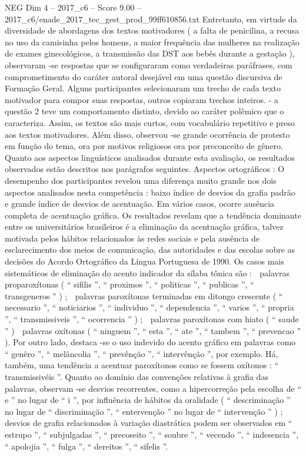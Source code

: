 \begin{textsample}{NEG Dim 4 – 2017\_c6 – Score 9.00 – 2017\_c6/enade\_2017\_tec\_gest\_prod\_99ff610856.txt}
Entretanto, em virtude da diversidade de abordagens dos textos motivadores ( a falta de penicilina, a recusa no uso da camisinha pelos homens, a maior frequência das mulheres na realização de exames ginecológicos, a transmissão das DST aos bebês durante a gestação ), observaram -se respostas que se configuraram como verdadeiras paráfrases, com comprometimento do caráter autoral desejável em uma questão discursiva de Formação Geral.
Alguns participantes selecionaram um trecho de cada texto motivador para compor suas respostas, outros copiaram trechos inteiros. - a questão 2 teve um comportamento distinto, devido ao caráter polêmico que o caracteriza.
Assim, os textos são mais curtos, com vocabulário repetitivo e preso aos textos motivadores.
Além disso, observou -se grande ocorrência de protesto em função do tema, ora por motivos religiosos ora por preconceito de gênero.
Quanto aos aspectos linguísticos analisados durante esta avaliação, os resultados observados estão descritos nos parágrafos seguintes.
Aspectos ortográficos : O desempenho dos participantes revelou uma diferença muito grande nos dois aspectos analisados nesta competência : baixo índice de desvios da grafia padrão e grande índice de desvios de acentuação.
Em vários casos, ocorre ausência completa de acentuação gráfica.
Os resultados revelam que a tendência dominante entre os universitários brasileiros é a eliminação da acentuação gráfica, talvez motivada pelos hábitos relacionados às redes sociais e pela ausência de esclarecimento dos meios de comunicação, das autoridades e das escolas sobre as decisões do Acordo Ortográfico da Língua Portuguesa de 1990.
Os casos mais sistemáticos de eliminação do acento indicador da sílaba tônica são :  palavras proparoxítonas ( “ sifilis ”, “ proximos ”, “ politicas ”, “ publicas ”, “ transgeneros ” ) ;  palavras paroxítonas terminadas em ditongo crescente ( “ necessario ”, “ noticiarios ”, “ individuo ”, “ dependencia ”, “ varios ”, “ propria ”, “ transmissiveis ”, “ ocorrencia ” ) ;  palavras paroxítonas com hiato ( “ saude ” )  palavras oxítonas ( “ ninguem ”, “ esta ”, “ ate ”, “ tambem ”, “ prevencao ” ).
Por outro lado, destaca -se o uso indevido do acento gráfico em palavras como “ genêro ”, “ melâncolia ”, “ prevênção ”, “ intervênção ”, por exemplo.
Há, também, uma tendência a acentuar paroxítonos como se fossem oxítonos : “ transmissivéis ”.
Quanto ao domínio das convenções relativas à grafia das palavras, observam -se desvios recorrentes, como a hipercorreção pela escolha de “ e ” no lugar de “ i ”, por influência de hábitos da oralidade ( “ descriminação ” no lugar de “ discriminação ”, “ entervenção ” no lugar de “ intervenção ” ) ; desvios de grafia relacionados à variação diastrática podem ser observados em “ estrupo ”, “ subjulgadas ”, “ precoseito ”, “ soubre ”, “ vecendo ”, “ indesencia ”, “ apolojia ”, “ fulga ”, “ dereitos ”, “ sifelis ”.

\end{textsample}
